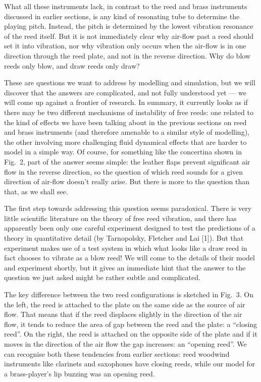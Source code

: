   What all these instruments lack, in contrast to the reed and brass 
  instruments discussed in earlier sections, is any kind of resonating tube to 
  determine the playing pitch. Instead, the pitch is determined by the lowest 
  vibration resonance of the reed itself. But it is not immediately clear why 
  air-flow past a reed should set it into vibration, nor why vibration only 
  occurs when the air-flow is in one direction through the reed plate, and not 
  in the reverse direction. Why do blow reeds only blow, and draw reeds only 
  draw? 

  These are questions we want to address by modelling and simulation, but we 
  will discover that the answers are complicated, and not fully understood yet 
  --- we will come up against a frontier of research. In summary, it currently 
  looks as if there may be two different mechanisms of instability of free 
  reeds: one related to the kind of effects we have been talking about in the 
  previous sections on reed and brass instruments (and therefore amenable to a 
  similar style of modelling), the other involving more challenging fluid 
  dynamical effects that are harder to model in a simple way. Of course, for 
  something like the concertina shown in Fig.\ 2, part of the answer seems 
  simple: the leather flaps prevent significant air flow in the reverse 
  direction, so the question of which reed sounds for a given direction of 
  air-flow doesn't really arise. But there is more to the question than that, 
  as we shall see. 

  The first step towards addressing this question seems paradoxical. There is 
  very little scientific literature on the theory of free reed vibration, and 
  there has apparently been only one careful experiment designed to test the 
  predictions of a theory in quantitative detail (by Tarnopolsky, Fletcher and 
  Lai [1]). But that experiment makes use of a test system in which what looks 
  like a draw reed in fact chooses to vibrate as a blow reed! We will come to 
  the details of their model and experiment shortly, but it gives an immediate 
  hint that the answer to the question we just asked might be rather subtle and 
  complicated. 

  The key difference between the two reed configurations is sketched in Fig.\ 
  3. On the left, the reed is attached to the plate on the same side as the 
  source of air flow. That means that if the reed displaces slightly in the 
  direction of the air flow, it tends to reduce the area of gap between the 
  reed and the plate: a “closing reed”. On the right, the reed is attached on 
  the opposite side of the plate and if it moves in the direction of the air 
  flow the gap increases: an “opening reed”. We can recognise both these 
  tendencies from earlier sections: reed woodwind instruments like clarinets 
  and saxophones have closing reeds, while our model for a brass-player’s lip 
  buzzing was an opening reed. 

